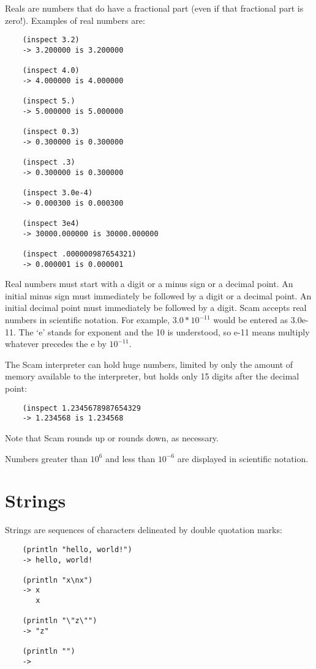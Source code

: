 Reals are numbers that do have a fractional part (even if that fractional
part is zero!). Examples of real numbers are:

\begin{verbatim}
    (inspect 3.2)
    -> 3.200000 is 3.200000
    
    (inspect 4.0)
    -> 4.000000 is 4.000000
       
    (inspect 5.)
    -> 5.000000 is 5.000000
       
    (inspect 0.3)
    -> 0.300000 is 0.300000
       
    (inspect .3)
    -> 0.300000 is 0.300000
    
    (inspect 3.0e-4)
    -> 0.000300 is 0.000300
    
    (inspect 3e4)
    -> 30000.000000 is 30000.000000
    
    (inspect .000000987654321)
    -> 0.000001 is 0.000001
\end{verbatim}

Real numbers must start with a digit or a minus sign or a decimal
point. An initial minus sign must immediately be followed by a digit or a
decimal point. An initial decimal point must immediately be followed by
a digit. Scam accepts real numbers in scientific notation. For example,
$3.0 * 10^{-11}$ would be entered as 3.0e-11. The `e' stands for exponent and
the 10 is understood, so e-11 means multiply whatever precedes the
e by $10^{-11}$.

The Scam interpreter can hold huge numbers,
limited by only the amount of memory available to the
interpreter,
but holds only 15 digits after the decimal point:

\begin{verbatim}
    (inspect 1.2345678987654329
    -> 1.234568 is 1.234568
\end{verbatim}

Note that Scam rounds up or rounds down, as necessary.

Numbers greater than $10^6$ and
less than $10^{-6}$ are displayed in
scientific notation.

\section{Strings}

Strings are sequences of characters delineated by double quotation marks:

\begin{verbatim}
    (println "hello, world!")
    -> hello, world!
    
    (println "x\nx")
    -> x
       x
    
    (println "\"z\"")
    -> "z" 
    
    (println "")
    -> 
\end{verbatim}

